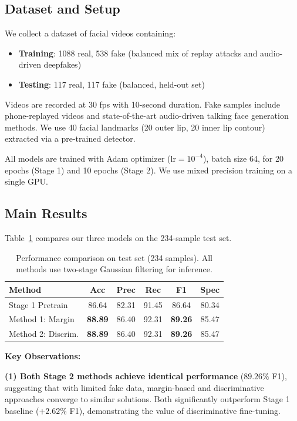 \documentclass[11pt,twocolumn]{article}
\begin{document}
\subsection{Dataset and Setup}

We collect a dataset of facial videos containing:
\begin{itemize}
    \item \textbf{Training}: 1088 real, 538 fake (balanced mix of replay attacks and audio-driven deepfakes)
    \item \textbf{Testing}: 117 real, 117 fake (balanced, held-out set)
\end{itemize}

Videos are recorded at 30 fps with 10-second duration. Fake samples include phone-replayed videos and state-of-the-art audio-driven talking face generation methods. We use 40 facial landmarks (20 outer lip, 20 inner lip contour) extracted via a pre-trained detector.

All models are trained with Adam optimizer ($\text{lr}=10^{-4}$), batch size 64, for 20 epochs (Stage 1) and 10 epochs (Stage 2). We use mixed precision training on a single GPU.

\subsection{Main Results}

Table~\ref{tab:main_results} compares our three models on the 234-sample test set.

\begin{table}[t]
\caption{Performance comparison on test set (234 samples). All methods use two-stage Gaussian filtering for inference.}
\label{tab:main_results}
\centering
\small
\begin{tabular}{lccccc}
\toprule
Method & Acc & Prec & Rec & F1 & Spec \\
\midrule
Stage 1 Pretrain & 86.64 & 82.31 & 91.45 & 86.64 & 80.34 \\
\midrule
Method 1: Margin & \textbf{88.89} & 86.40 & 92.31 & \textbf{89.26} & 85.47 \\
Method 2: Discrim. & \textbf{88.89} & 86.40 & 92.31 & \textbf{89.26} & 85.47 \\
\bottomrule
\end{tabular}
\end{table}

\textbf{Key Observations:}

\textbf{(1) Both Stage 2 methods achieve identical performance} ($89.26\%$ F1), suggesting that with limited fake data, margin-based and discriminative approaches converge to similar solutions. Both significantly outperform Stage 1 baseline ($+2.62\%$ F1), demonstrating the value of discriminative fine-tuning.
\end{document}

